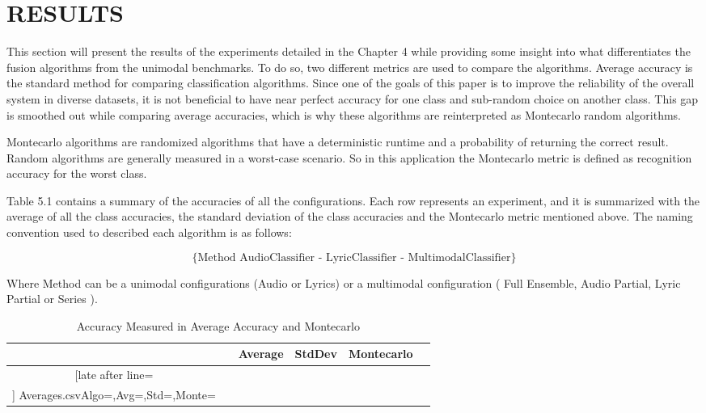 \renewcommand{\chaptername}{}

\chapter{RESULTS}
 
This section will present the results of the experiments detailed in the Chapter 4 while providing 
some insight into what differentiates the fusion algorithms from the unimodal benchmarks. To do 
so, two different metrics are used to compare the algorithms. Average accuracy is the standard 
method for comparing classification algorithms. Since one of the goals of this paper is to improve 
the reliability of the overall system in diverse datasets, it is not beneficial to have near perfect 
accuracy for one class and sub-random choice on another class. This gap is smoothed out while 
comparing average accuracies, which is why these algorithms are reinterpreted as Montecarlo 
random algorithms. 

Montecarlo algorithms are randomized algorithms that have a deterministic runtime and a probability 
of returning the correct result. Random algorithms are generally measured in a worst-case scenario. 
So in this application the Montecarlo metric is defined as recognition accuracy for the worst class. 

Table 5.1 contains a summary of the accuracies of all the configurations. Each row represents an
 experiment, and it is summarized with the average of all the class accuracies, the standard deviation 
 of the class accuracies and the Montecarlo metric mentioned above.  The naming convention used
 to described each algorithm is as follows: 
 
 \[ \{\text{Method  AudioClassifier - LyricClassifier - MultimodalClassifier}\}  \]  
 
 Where Method can be a unimodal configurations (Audio or Lyrics) or a multimodal configuration 
 ( Full Ensemble, Audio Partial, Lyric Partial or Series ).
 
\begin{table}
\small{
	  \caption{Accuracy Measured in Average Accuracy and Montecarlo }
	\begin{tabular}{| c | l | c l  c  |  c|}\hline%
	& & Average & StdDev & Montecarlo\\\hline \csvreader[late after line=\\\hline]%
	{Averages.csv}{Algo=\name,Avg=\avg,Std=\std,Monte=\mte}%
	{\thecsvrow &  \name & \avg & \std & \mte}%
	\end{tabular}
}
\end{table}
\newpage

